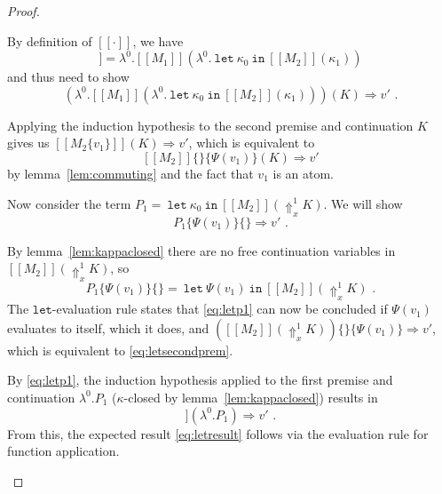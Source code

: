 \documentclass[a4paper,11pt,draft]{article}
\newcommand{\kw}[1]{\mathtt{#1}}
\begin{document}
\begin{proof}
\begin{description}
By definition of $[\![\cdot]\!]$, we have
\begin{equation*}
  [\![\kw{let} \: M_{1} \: \kw{in} \: M_{2}]\!]
  = \lambda^{0}.[\![M_{1}]\!](\lambda^{0}. \: \kw{let} \: \kappa_{0} \: \kw{in} \: [\![M_{2}]\!](\kappa_{1}))
\end{equation*}
and thus need to show
\begin{equation}\label{eq:letresult}
  (\lambda^{0}.[\![M_{1}]\!](\lambda^{0}. \: \kw{let} \: \kappa_{0} \: \kw{in} \: [\![M_{2}]\!](\kappa_{1})))(K)
  \Rightarrow v' \text{ .}
\end{equation}

Applying the induction hypothesis to the second premise and continuation $K$ gives us
$[\![M_{2}\{v_{1}\}]\!](K) \Rightarrow v'$, which is equivalent to
\begin{equation}\label{eq:letsecondprem}
  [\![M_{2}]\!]\{\}\{\Psi(v_{1})\}(K) \Rightarrow v'
\end{equation}
by lemma~\ref{lem:commuting} and the fact that $v_{1}$ is an atom.

Now consider the term $P_{1} = \: \kw{let} \: \kappa_{0} \: \kw{in} \: [\![M_{2}]\!](\Uparrow_{x}^{1} K)$. We
will show
\begin{equation}\label{eq:letp1}
  P_{1}\{\Psi(v_{1})\}\{\} \Rightarrow v' \text{ .}
\end{equation}

By lemma~\ref{lem:kappaclosed} there are no free continuation variables in
$[\![M_{2}]\!](\Uparrow_{x}^{1} K)$, so
\begin{equation*}
  P_{1}\{\Psi(v_{1})\}\{\} = \: \kw{let} \: \Psi(v_{1}) \: \kw{in} \: [\![M_{2}]\!](\Uparrow_{x}^{1} K) \text{ .}
\end{equation*}
The $\kw{let}$-evaluation rule states that \eqref{eq:letp1} can now be concluded if
$\Psi(v_{1})$ evaluates to itself, which it does, and
$([\![M_{2}]\!](\Uparrow_{x}^{1} K))\{\}\{\Psi(v_{1})\} \Rightarrow v'$, which is
equivalent to \eqref{eq:letsecondprem}.

By \eqref{eq:letp1}, the induction hypothesis applied to the first premise and
continuation $\lambda^{0}.P_{1}$ ($\kappa$-closed by lemma~\ref{lem:kappaclosed})
results in
\begin{equation*}
  [\![M_{1}]\!](\lambda^{0}.P_{1}) \Rightarrow v' \text{ .}
\end{equation*}
From this, the expected result \eqref{eq:letresult} follows via the evaluation rule for
function application.\qedhere
\end{description}
\end{proof}




\end{document}
